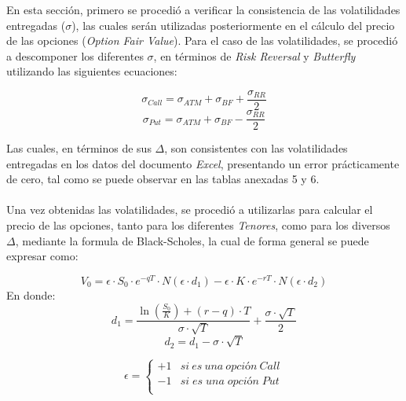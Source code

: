 En esta sección, primero se procedió a verificar la consistencia de las volatilidades entregadas ($\sigma$), las cuales serán utilizadas posteriormente en el cálculo del precio de las opciones (\textit{Option Fair Value}). Para el caso de las volatilidades, se procedió a descomponer los diferentes $\sigma$, en términos de \textit{Risk Reversal} y \textit{Butterfly} utilizando las siguientes ecuaciones:

\begin{equation}
    \sigma_{Call}= \sigma_{ATM}+\sigma_{BF}+\frac{\sigma_{RR}}{2}
\end{equation}
\begin{equation}
    \sigma_{Put}= \sigma_{ATM}+\sigma_{BF}-\frac{\sigma_{RR}}{2}
\end{equation}

\noindent Las cuales, en términos de sus $\Delta$, son consistentes con las volatilidades entregadas en los datos del documento \textit{Excel}, presentando un error prácticamente de cero, tal como se puede observar en las tablas anexadas 5 y 6. \\\\
\noindent Una vez obtenidas las volatilidades, se procedió a utilizarlas para calcular el precio de las opciones, tanto para los diferentes \textit{Tenores}, como para los diversos $\Delta$, mediante la formula de Black-Scholes, la cual de forma general se puede expresar como:

\begin{equation}
    V_0= \epsilon \cdot S_0 \cdot e^{-qT} \cdot N(\epsilon \cdot d_1) - \epsilon \cdot K \cdot e^{-rT} \cdot N(\epsilon \cdot d_2)
    \label{BlackScholes}
\end{equation}
\noindent En donde:
\begin{equation*}
    d_1= \frac{\ln(\frac{S_0}{K})+(r-q)\cdot T}{\sigma \cdot \sqrt{T}}+ \frac{\sigma \cdot \sqrt{T}}{2}
\end{equation*}
\begin{equation*}
    d_2=d_1-\sigma \cdot \sqrt{T}
\end{equation*}

     \begin{equation*}
     \label{eq:aqui-le-mostramos-como-hacerle-la-llave-grande}
     \epsilon = \left\{
	       \begin{array}{ll}
		 +1      &  si\ es\ una\ opción\ Call\\
		 -1 &  si\;es\;una\;opción\;Put\\
		 
	       \end{array}
	     \right.
   \end{equation*}
   

